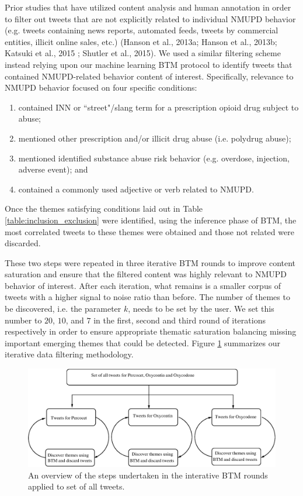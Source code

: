 Prior studies that have utilized content analysis and human annotation 
in order to filter out tweets that are not explicitly related to 
individual NMUPD behavior (e.g. tweets containing news reports, 
automated feeds, tweets by commercial entities, illicit online sales, etc.) 
\cite{katsuki2015establishing,hanson2013tweaking,hanson2013exploration,shutler2015drug}
(Hanson et al., 2013a; Hanson et al., 2013b; Katsuki et al., 2015 ;  Shutler et al., 2015). 
We used a similar filtering scheme instead relying upon our machine 
learning BTM protocol to identify tweets that contained 
NMUPD-related behavior content of interest. Specifically, relevance to NMUPD behavior focused on 
four specific conditions: 
\begin{enumerate}
\item contained INN or ``street"/slang term for a prescription opioid drug subject to abuse; 
\item mentioned other prescription and/or illicit drug abuse (i.e. polydrug abuse); 
\item mentioned identified substance abuse risk behavior (e.g. overdose, injection, adverse event); and 
\item contained a commonly used adjective or verb related to NMUPD. 
\end{enumerate}

Once the themes satisfying conditions laid out in Table \ref{table:inclusion_exclusion} 
were identified, using the inference phase of BTM, the most 
correlated tweets to these themes were obtained and those not related were discarded.

These two steps were repeated in three iterative BTM rounds to improve 
content saturation and ensure that the filtered content was 
highly relevant to NMUPD behavior of interest. After each iteration, 
what remains is a smaller corpus of tweets with a higher signal to 
noise ratio than before. The number of themes to be discovered, i.e. the parameter $k$, 
needs to be set by the user. We set this number to $20$, $10$, and $7$ in the first, 
second and third round of iterations respectively in order to ensure 
appropriate thematic saturation balancing missing important 
emerging themes that could be detected. 
Figure \ref{fig:overview_methodology} summarizes our iterative data filtering methodology.

\begin{figure}
\centering
\includegraphics[width=\textwidth]{AB/chart}
\caption[Data analysis overview]{An overview of the steps undertaken in the interative BTM rounds applied to set of all tweets.}
\label{fig:overview_methodology}
\end{figure}


